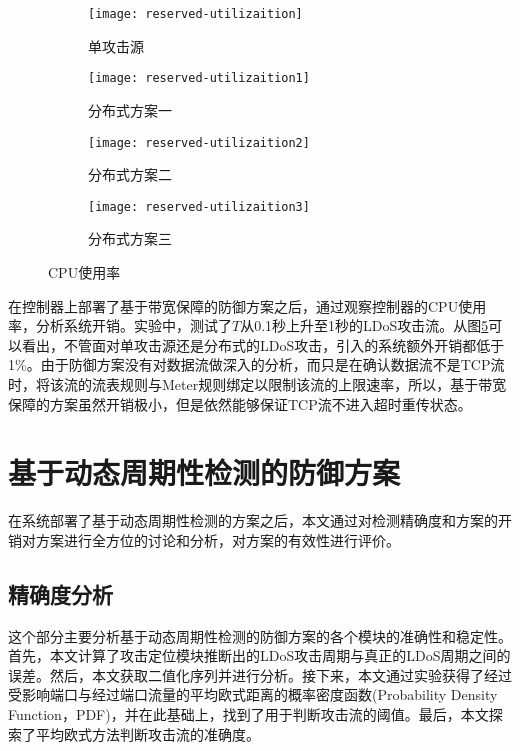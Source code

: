 \begin{figure}
    \begin{subfigure}{.49\textwidth}
        \centering
        \texttt{[image: reserved-utilizaition]}
        \caption{单攻击源}
        \label{fig:reserved-CPU-single}
    \end{subfigure}
    \begin{subfigure}{.49\textwidth}
        \centering
        \texttt{[image: reserved-utilizaition1]}
        \caption{分布式方案一}
        \label{fig:reserved-CPU-2h-mod1}
    \end{subfigure}

    \begin{subfigure}{.49\textwidth}
        \centering
        \texttt{[image: reserved-utilizaition2]}
        \caption{分布式方案二}
        \label{fig:reserved-CPU-2h-mod2}
    \end{subfigure}
    \begin{subfigure}{.49\textwidth}
        \centering
        \texttt{[image: reserved-utilizaition3]}
        \caption{分布式方案三}
        \label{fig:reserved-CPU-2h-mod3}
    \end{subfigure}


    \caption{CPU使用率}
    \label{fig:reserved-CPU-all}
\end{figure}


在控制器上部署了基于带宽保障的防御方案之后，通过观察控制器的CPU使用率，分析系统开销。实验中，测试了$T$从0.1秒上升至1秒的LDoS攻击流。从图\ref{fig:reserved-CPU-all}可以看出，不管面对单攻击源还是分布式的LDoS攻击，引入的系统额外开销都低于1\%。由于防御方案没有对数据流做深入的分析，而只是在确认数据流不是TCP流时，将该流的流表规则与Meter规则绑定以限制该流的上限速率，所以，基于带宽保障的方案虽然开销极小，但是依然能够保证TCP流不进入超时重传状态。




\section{基于动态周期性检测的防御方案}
\label{chap5:exp-period-detection}
在系统部署了基于动态周期性检测的方案之后，本文通过对检测精确度和方案的开销对方案进行全方位的讨论和分析，对方案的有效性进行评价。

\subsection{精确度分析}
\label{chap5:accuracy}
这个部分主要分析基于动态周期性检测的防御方案的各个模块的准确性和稳定性。首先，本文计算了攻击定位模块推断出的LDoS攻击周期与真正的LDoS周期之间的误差。然后，本文获取二值化序列并进行分析。接下来，本文通过实验获得了经过受影响端口与经过端口流量的平均欧式距离的概率密度函数(Probability Density Function，PDF)，并在此基础上，找到了用于判断攻击流的阈值。最后，本文探索了平均欧式方法判断攻击流的准确度。

